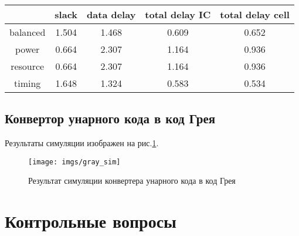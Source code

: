 \documentclass[a4paper,14pt]{article}
\begin{document}
\begin{table}[H]
	\begin{center}
		\begin{flushleft}
		\end{flushleft}
		\label{tab:decoder}
		\begin{tabular}{|c|c|c|c|c|}
			\hline
			& slack & data delay & total delay IC & total delay cell \\ \hline
			balanced & 1.504 & 1.468      & 0.609          & 0.652            \\ \hline
			power    & 0.664 & 2.307      & 1.164          & 0.936            \\ \hline
			resource & 0.664 & 2.307      & 1.164          & 0.936            \\ \hline
			timing   & 1.648 & 1.324      & 0.583          & 0.534            \\ \hline
		\end{tabular}
	\end{center}
\end{table}

\subsection{Конвертор унарного кода в код Грея}


Результаты симуляции изображен на рис.\ref{fig:gray_sim}.
\begin{figure}[H]
	\centering
	\texttt{[image: imgs/gray\_sim]}
	\caption{Результат симуляции конвертера унарного кода в код Грея}
	\label{fig:gray_sim}
\end{figure}
 
\section{Контрольные вопросы}
\end{document}
